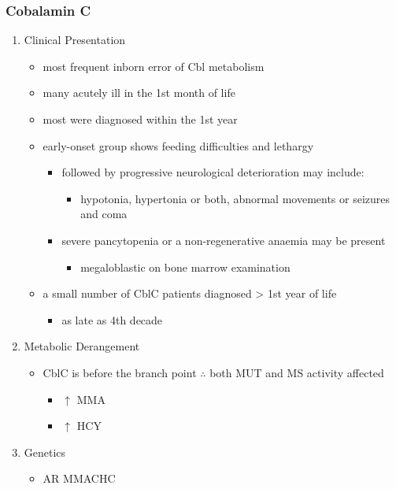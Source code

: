 \documentclass[12pt]{scrartcl}
\begin{document}
\subsubsection{Cobalamin C}
\label{sec:orgbd890f2}
\begin{enumerate}
\item Clinical Presentation
\label{sec:org1a405cf}
\begin{itemize}
\item most frequent inborn error of Cbl metabolism
\item many acutely ill in the 1st month of life
\item most were diagnosed within the 1st year
\item early-onset group shows feeding difficulties and lethargy
\begin{itemize}
\item followed by progressive neurological deterioration may include: 
\begin{itemize}
\item hypotonia, hypertonia or both, abnormal movements or seizures
and coma
\end{itemize}
\item severe pancytopenia or a non-regenerative anaemia may be present
\begin{itemize}
\item megaloblastic on bone marrow examination
\end{itemize}
\end{itemize}
\item a small number of CblC patients diagnosed \textgreater{} 1st year of life
\begin{itemize}
\item as late as 4th decade
\end{itemize}
\end{itemize}

\item Metabolic Derangement
\label{sec:orgd1aff0c}
\begin{itemize}
\item CblC is before the branch point \(\therefore\) both MUT and MS activity affected
\begin{itemize}
\item \(\uparrow\) MMA
\item \(\uparrow\) HCY
\end{itemize}
\end{itemize}

\item Genetics
\label{sec:orgcb6c0c2}
\begin{itemize}
\item AR MMACHC
\end{itemize}


\end{enumerate}
\end{document}
